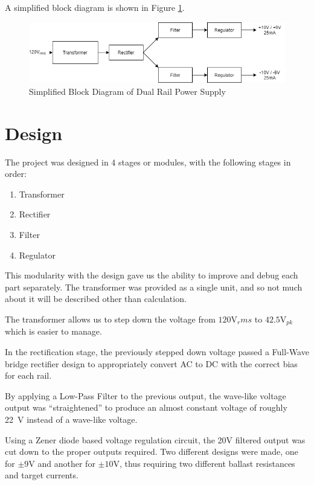 \documentclass[12pt]{article}
\begin{document}
A simplified block diagram is shown in Figure \ref{fig:blockDiagram}.

\begin{figure}
    \centering
    \includegraphics[width = \textwidth]{302Lab1BlockDiagram.png}
    \caption{Simplified Block Diagram of Dual Rail Power Supply}
    \label{fig:blockDiagram}
\end{figure}

\section{Design}
The project was designed in 4 stages or modules, with the following stages in order:
\begin{enumerate}
    \item Transformer
    \item Rectifier
    \item Filter
    \item Regulator
\end{enumerate}
This modularity with the design gave us the ability to improve and debug each part separately. The transformer was provided as a single unit, and so not much about it will be described other than calculation. 

The transformer allows us to step down the voltage from $120\si{\volt}_rms$ to $42.5\si{\volt}_{pk}$ which is easier to manage.

In the rectification stage, the previously stepped down voltage passed a Full-Wave bridge rectifier design to appropriately convert AC to DC with the correct bias for each rail.

By applying a Low-Pass Filter to the previous output, the wave-like voltage output was ``straightened'' to produce an almost constant voltage of roughly \SI{22}{\volt} instead of a wave-like voltage.

Using a Zener diode based voltage regulation circuit, the 20V filtered output was cut down to the proper outputs required. Two different designs were made, one for $\pm 9\si{\volt}$ and another for $\pm 10\si{\volt}$, thus requiring two different ballast resistances and target currents.
\end{document}

